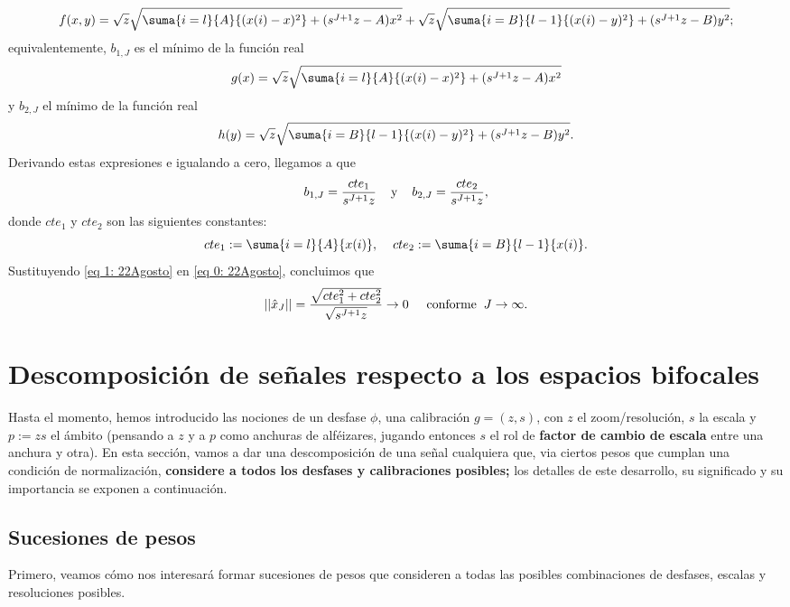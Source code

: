 \[
f(x,y)= \sqrt{z} \sqrt{\suma{i=l}{A}{(x(i)-x)^{2}}+(s^{J+1}z-A)x^{2}}+
\sqrt{z} \sqrt{\suma{i=B}{l-1}{(x(i)-y)^{2}}+(s^{J+1}z-B)y^{2}};
\]
\noindent
equivalentemente, $b_{1,J}$ es el mínimo de la 
función real
\[
g(x)=\sqrt{z} \sqrt{\suma{i=l}{A}{(x(i)-x)^{2}}+(s^{J+1}z-A)x^{2}}
\]
y $b_{2,J}$ el mínimo de la función real
\[
h(y)=\sqrt{z} \sqrt{\suma{i=B}{l-1}{(x(i)-y)^{2}}+(s^{J+1}z-B)y^{2}}.
\]
\noindent
Derivando estas expresiones e igualando a cero,
llegamos a que
\begin{equation} \label{eq 1: 22Agosto}
b_{1,J}= \frac{cte_{1}}{s^{J+1}z} \hspace{0.4cm} \text{y}
\hspace{0.4cm} b_{2,J}= \frac{cte_{2}}{s^{J+1}z},
\end{equation}
donde $cte_{1}$ y $cte_{2}$ son las siguientes constantes:
\[
cte_{1}:= \suma{i=l}{A}{x(i)}, \hspace{0.4cm}
cte_{2}:= \suma{i=B}{l-1}{x(i)}.
\]
Sustituyendo \eqref{eq 1: 22Agosto}
en \eqref{eq 0: 22Agosto}, concluimos que
\[
|| \hat{x}_{J} || = \frac{\sqrt{cte_{1}^{2}+ cte_{2}^{2}}}{\sqrt{s^{J+1}z}}
\rightarrow 0 \hspace{0.5cm} \text{conforme} 
\hspace{0.2cm} J \rightarrow \infty.
\]
\QEDB



\section{Descomposición de señales respecto a los espacios bifocales}

Hasta el momento, hemos introducido
las nociones de un desfase $\phi$, una calibración $g=(z,s)$,
con $z$ el zoom/resolución, $s$ la escala y 
$p:=zs$ el ámbito (pensando a $z$ y a $p$
como anchuras de alféizares, jugando entonces $s$
el rol de \textbf{factor de cambio de escala} entre una anchura y otra).
En esta sección, vamos a dar una descomposición
de una señal cualquiera que, via ciertos pesos que
cumplan una condición de normalización, \textbf{considere
a todos los desfases y calibraciones posibles;}
los detalles de este desarrollo,
su significado y su importancia
se exponen a continuación.

\subsection{Sucesiones de pesos}

Primero, veamos cómo nos interesará formar sucesiones
de pesos que consideren a todas las 
posibles combinaciones de desfases, 
escalas y resoluciones posibles.

